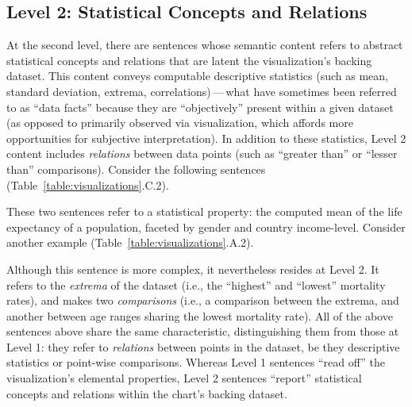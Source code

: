 \subsection{Level 2: Statistical Concepts and Relations}

At the second level, there are sentences whose semantic content refers to abstract statistical concepts and relations that are latent the visualization’s backing dataset.
This content conveys computable descriptive statistics (such as mean, standard deviation, extrema, correlations)\,---\,what have sometimes been referred to as ``data facts'' because they are ``objectively'' present within a given dataset~\cite{srinivasan_augmenting_2019, wang_datashot_2020} (as opposed to primarily observed via visualization, which affords more opportunities for subjective interpretation).
In addition to these statistics, Level 2 content includes \emph{relations} between data points (such as ``greater than'' or ``lesser than'' comparisons).
Consider the following sentences (Table~\ref{table:visualizations}.C.2).
\begin{quote}
    \small
    \vspace{-1mm}
    \vspace{-1mm}
\end{quote}

\noindent
These two sentences refer to a statistical property: the computed mean of the life expectancy of a population, faceted by gender and country income-level.
Consider another example (Table~\ref{table:visualizations}.A.2).

\begin{quote}
    \small
    \vspace{-1mm}
    \vspace{-1mm}
\end{quote}

\noindent
Although this sentence is more complex, it nevertheless resides at Level 2. It refers to the \emph{extrema} of the dataset (i.e., the ``highest'' and ``lowest'' mortality rates), and makes two \emph{comparisons} (i.e., a comparison between the extrema, and another between age ranges sharing the lowest mortality rate).
All of the above sentences above share the same characteristic, distinguishing them from those at Level 1: they refer to \emph{relations} between points in the dataset, be they descriptive statistics or point-wise comparisons.
Whereas Level 1 sentences ``read off'' the visualization's elemental properties, Level 2 sentences ``report'' statistical concepts and relations within the chart's backing dataset.

